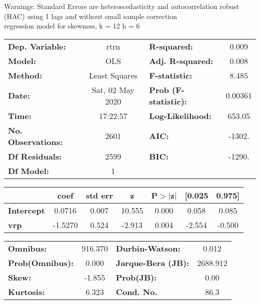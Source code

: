 Warnings: \newline
 [1] Standard Errors are heteroscedasticity and autocorrelation robust (HAC) using 1 lags and without small sample correction\\ 

regression model for skewness, k = 12 h = 6\begin{center}
\begin{tabular}{lclc}
\toprule
\textbf{Dep. Variable:}    &       rtrn       & \textbf{  R-squared:         } &     0.009   \\
\textbf{Model:}            &       OLS        & \textbf{  Adj. R-squared:    } &     0.008   \\
\textbf{Method:}           &  Least Squares   & \textbf{  F-statistic:       } &     8.485   \\
\textbf{Date:}             & Sat, 02 May 2020 & \textbf{  Prob (F-statistic):} &  0.00361    \\
\textbf{Time:}             &     17:22:57     & \textbf{  Log-Likelihood:    } &    653.05   \\
\textbf{No. Observations:} &        2601      & \textbf{  AIC:               } &    -1302.   \\
\textbf{Df Residuals:}     &        2599      & \textbf{  BIC:               } &    -1290.   \\
\textbf{Df Model:}         &           1      & \textbf{                     } &             \\
\bottomrule
\end{tabular}
\begin{tabular}{lcccccc}
                   & \textbf{coef} & \textbf{std err} & \textbf{z} & \textbf{P$> |$z$|$} & \textbf{[0.025} & \textbf{0.975]}  \\
\midrule
\textbf{Intercept} &       0.0716  &        0.007     &    10.555  &         0.000        &        0.058    &        0.085     \\
\textbf{vrp}       &      -1.5270  &        0.524     &    -2.913  &         0.004        &       -2.554    &       -0.500     \\
\bottomrule
\end{tabular}
\begin{tabular}{lclc}
\textbf{Omnibus:}       & 916.370 & \textbf{  Durbin-Watson:     } &    0.012  \\
\textbf{Prob(Omnibus):} &   0.000 & \textbf{  Jarque-Bera (JB):  } & 2688.912  \\
\textbf{Skew:}          &  -1.855 & \textbf{  Prob(JB):          } &     0.00  \\
\textbf{Kurtosis:}      &   6.323 & \textbf{  Cond. No.          } &     86.3  \\
\bottomrule
\end{tabular}
\end{center}


